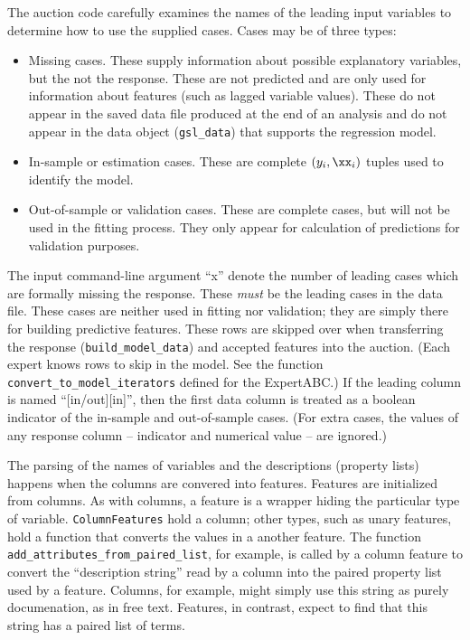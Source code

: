 \documentclass[12pt]{article}
\begin{document}
 The auction code carefully examines the names of the leading input variables to
 determine how to use the supplied cases.  Cases may be of three types:
\begin{itemize}
\item Missing cases.  These supply information about possible explanatory
 variables, but the not the response.  These are not predicted and are only used
 for information about features (such as lagged variable values).  These do not
 appear in the saved data file produced at the end of an analysis and do not
 appear in the data object ({\tt gsl\_data}) that supports the regression model.
\item In-sample or estimation cases.  These are complete $(y_i,\xx_i)$ tuples
 used to identify the model.
\item Out-of-sample or validation cases. These are complete cases, but will not
 be used in the fitting process.  They only appear for calculation of
 predictions for validation purposes.
\end{itemize}
 The input command-line argument ``x'' denote the number of leading cases which
 are formally missing the response.  These {\em must} be the leading cases in
 the data file.  These cases are neither used in fitting nor validation; they
 are simply there for building predictive features.  These rows are skipped over
 when transferring the response ({\tt build\_model\_data}) and accepted features
 into the auction.  (Each expert knows rows to skip in the model. See the
 function {\tt convert\_to\_model\_iterators} defined for the ExpertABC.)  If
 the leading column is named ``[in/out][in]'', then the first data column is
 treated as a boolean indicator of the in-sample and out-of-sample cases.  (For
 extra cases, the values of any response column -- indicator and numerical value
 -- are ignored.)


 The parsing of the names of variables and the descriptions (property lists)
 happens when the columns are convered into features.  Features are initialized
 from columns.  As with columns, a feature is a wrapper hiding the particular
 type of variable.  {\tt ColumnFeatures} hold a column; other types, such as
 unary features, hold a function that converts the values in a another feature.
  The function {\tt add\_attributes\_from\_paired\_list}, for example, is called by
 a column feature to convert the ``description string'' read by a column into
 the paired property list used by a feature.  Columns, for example, might simply
 use this string as purely documenation, as in free text.  Features, in
 contrast, expect to find that this string has a paired list of terms.
\end{document}
